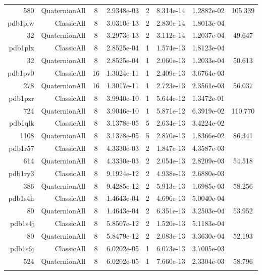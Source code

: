 \begin{xltabular}{\textwidth}{r|rcS[table-format=1.4e+2]cS[table-format=1.3e+2]S[table-format=1.4e+2]S[table-format=-1.3]}
580 & QuaternionAll & 8 & 2.9348e-03 & 2 & 8.314e-14 & 1.2882e-02 & 105.339\\  \addlinespace
pdb1plw & ClassicAll & 8 & 3.0310e-13 & 2 & 2.830e-14 & 1.8013e-04 & \\
32 & QuaternionAll & 8 & 3.2973e-13 & 2 & 3.112e-14 & 1.2037e-04 & 49.647\\  \addlinespace
pdb1plx & ClassicAll & 8 & 2.8525e-04 & 1 & 1.574e-13 & 1.8123e-04 & \\
32 & QuaternionAll & 8 & 2.8525e-04 & 1 & 2.060e-13 & 1.2033e-04 & 50.613\\  \addlinespace
pdb1pv0 & ClassicAll & 16 & 1.3024e-11 & 1 & 2.409e-13 & 3.6764e-03 & \\
278 & QuaternionAll & 16 & 1.3017e-11 & 1 & 2.723e-13 & 2.3561e-03 & 56.037\\  \addlinespace
pdb1pzr & ClassicAll & 8 & 3.9940e-10 & 1 & 5.644e-12 & 1.3472e-01 & \\
724 & QuaternionAll & 8 & 3.9046e-10 & 1 & 5.871e-12 & 6.3919e-02 & 110.770\\  \addlinespace
pdb1qlk & ClassicAll & 8 & 3.1378e-05 & 5 & 2.634e-13 & 3.4224e-02 & \\
1108 & QuaternionAll & 8 & 3.1378e-05 & 5 & 2.870e-13 & 1.8366e-02 & 86.341\\  \addlinespace
pdb1r57 & ClassicAll & 8 & 4.3330e-03 & 2 & 1.847e-13 & 4.3587e-03 & \\
614 & QuaternionAll & 8 & 4.3330e-03 & 2 & 2.054e-13 & 2.8209e-03 & 54.518\\  \addlinespace
pdb1ry3 & ClassicAll & 8 & 9.1924e-12 & 2 & 4.938e-13 & 2.6880e-03 & \\
386 & QuaternionAll & 8 & 9.4285e-12 & 2 & 5.913e-13 & 1.6985e-03 & 58.256\\  \addlinespace
pdb1s4h & ClassicAll & 8 & 1.4643e-04 & 2 & 4.696e-13 & 5.0040e-04 & \\
80 & QuaternionAll & 8 & 1.4643e-04 & 2 & 6.351e-13 & 3.2503e-04 & 53.952\\  \addlinespace
pdb1s4j & ClassicAll & 8 & 5.8507e-12 & 2 & 1.520e-13 & 5.1183e-04 & \\
80 & QuaternionAll & 8 & 5.8479e-12 & 2 & 2.083e-13 & 3.3630e-04 & 52.193\\  \addlinespace
pdb1s6j & ClassicAll & 8 & 6.0202e-05 & 1 & 6.073e-13 & 3.7005e-03 & \\
524 & QuaternionAll & 8 & 6.0202e-05 & 1 & 7.660e-13 & 2.3304e-03 & 58.796\\  \addlinespace

\end{xltabular}
